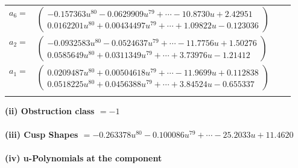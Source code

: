 \documentclass[1p]{elsarticle_modified}
\theoremstyle{definition}
\begin{document}
\begin{tabular}{m{7pt} m{180pt} m{7pt} m{180pt} }
\flushright $a_{6}=$&$\begin{pmatrix}-0.157363 u^{80}-0.0629909 u^{79}+\cdots-10.8730 u+2.42951\\0.0162201 u^{80}+0.00434497 u^{79}+\cdots+1.09822 u-0.123036\end{pmatrix}$ \\
\flushright $a_{2}=$&$\begin{pmatrix}-0.0932583 u^{80}-0.0524637 u^{79}+\cdots-11.7756 u+1.50276\\0.0585649 u^{80}+0.0311349 u^{79}+\cdots+3.73976 u-1.21412\end{pmatrix}$ \\
\flushright $a_{1}=$&$\begin{pmatrix}0.0209487 u^{80}+0.00504618 u^{79}+\cdots-11.9699 u+0.112838\\0.0518225 u^{80}+0.0456388 u^{79}+\cdots+3.84524 u-0.655337\end{pmatrix}$\\&\end{tabular}
\flushleft \textbf{(ii) Obstruction class $= -1$}\\~\\
\flushleft \textbf{(iii) Cusp Shapes $= -0.263378 u^{80}-0.100086 u^{79}+\cdots-25.2033 u+11.4620$}\\~\\
\newpage\renewcommand{\arraystretch}{1}
\flushleft \textbf{(iv) u-Polynomials at the component}\newline \\
\end{document}
